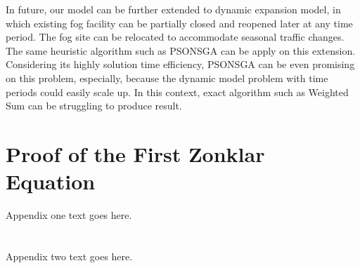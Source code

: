 \documentclass[10pt,journal,compsoc]{IEEEtran}
\begin{document}
In future, our model can be further extended to dynamic expansion model, in which existing fog facility can be partially closed and reopened later at any time period. The fog site can be relocated to accommodate seasonal traffic changes. The same heuristic algorithm such as PSONSGA can be apply on this extension. Considering its highly solution time efficiency, PSONSGA can be even promising on this problem, especially, because the dynamic model problem with time periods could easily scale up. In this context, exact algorithm such as Weighted Sum can be struggling to produce result.






%

\iffalse
\appendices
\section{Proof of the First Zonklar Equation}
Appendix one text goes here.

\section{}
Appendix two text goes here.
\end{document}
